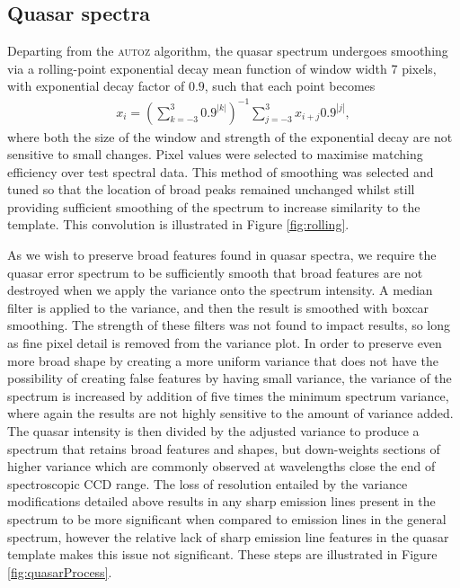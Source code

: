 \documentclass[5p]{elsarticle}
\newcommand{\autoz}{\textsc{autoz}}
\begin{document}
\subsection{Quasar spectra}




Departing from the \autoz{} algorithm, the quasar spectrum undergoes smoothing via a rolling-point exponential decay mean function of window width 7 pixels, with exponential decay factor of $0.9$, such that each point becomes
\begin{align}
x_i = \left( \sum_{k = -3}^3 0.9^{|k|}   \right)^{-1} \sum_{j = -3}^3 x_{i+j} 0.9^{|j|},
\end{align}
where both the size of the window and strength of the exponential decay are not sensitive to small changes. Pixel values were selected to maximise matching efficiency over test spectral data. This method of smoothing was selected and tuned so that the location of broad peaks remained unchanged whilst still providing sufficient smoothing of the spectrum to increase similarity to the template. This convolution is illustrated in Figure \ref{fig:rolling}.



As we wish to preserve broad features found in quasar spectra, we require the quasar error spectrum to be sufficiently smooth that broad features are not destroyed when we apply the variance onto the spectrum intensity. A median filter is applied to the variance, and then the result is smoothed with boxcar smoothing. The strength of these filters was not found to impact results, so long as fine pixel detail is removed from the variance plot. In order to preserve even more broad shape by creating a more uniform variance that does not have the possibility of creating false features by having small variance, the variance of the spectrum is increased by addition of five times the minimum spectrum variance, where again the results are not highly sensitive to the amount of variance added. The quasar intensity is then divided by the adjusted variance to produce a spectrum that retains broad features and shapes, but down-weights sections of higher variance which are commonly observed at wavelengths close the end of spectroscopic CCD range. The loss of resolution entailed by the variance modifications detailed above results in any sharp emission lines present in the spectrum to be more significant when compared to emission lines in the general spectrum, however the relative lack of sharp emission line features in the quasar template makes this issue not significant. These steps are illustrated in Figure \ref{fig:quasarProcess}.\\
\end{document}
